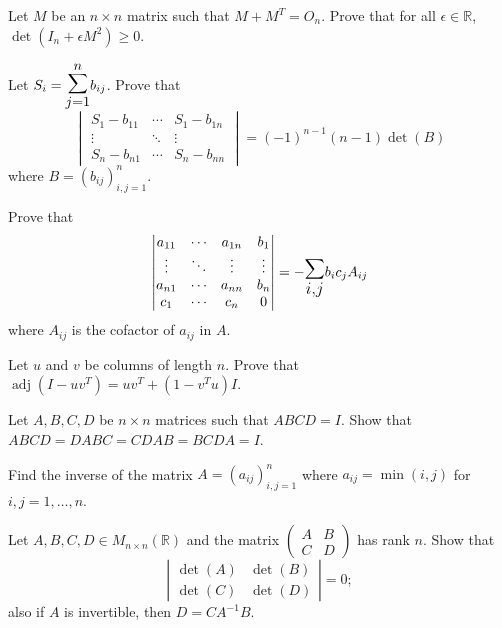 \documentclass[12pt]{article}
\let\oldsum\sum
\renewcommand{\sum}{\mathlarger{\mathlarger{\oldsum}}}
\begin{document}
\begin{problem}
Let $M$ be an $n\times n$ matrix such that $M+M^T=O_n$. Prove that for all $\epsilon\in\mathbb{R}$, $\det(I_n+\epsilon M^2) \ge 0$.
\end{problem}

\begin{problem}
Let $S_i = \sum_{j=1}^n b_{ij}$. Prove that
\[
\begin{vmatrix} S_1-b_{11} & \cdots & S_1-b_{1n}\\ \vdots & \ddots & \vdots\\ S_n-b_{n1} & \cdots & S_n-b_{nn}\end{vmatrix} = (-1)^{n-1}(n-1)\det(B)
\]
where $B=(b_{ij})_{i,j=1}^n$.
\end{problem}

\begin{problem}
Prove that
\[
\begin{vmatrix}
a_{11} & \cdots & a_{1n} & b_1\\
\vdots & \ddots & \vdots & \vdots\\
a_{n1} & \cdots & a_{nn} & b_n\\
c_1 & \cdots & c_n & 0
\end{vmatrix} = -\sum_{i,j} b_ic_jA_{ij}
\]
where $A_{ij}$ is the cofactor of $a_{ij}$ in $A$.
\end{problem}

\begin{problem}
Let $u$ and $v$ be columns of length $n$. Prove that $\operatorname{adj}(I-uv^T) = uv^T + (1-v^Tu)I$.
\end{problem}

\begin{problem}
Let $A,B,C,D$ be $n\times n$ matrices such that $ABCD=I$. Show that $ABCD = DABC = CDAB = BCDA = I$.
\end{problem}

\begin{problem}
Find the inverse of the matrix $A=(a_{ij})_{i,j=1}^n$ where $a_{ij}=\min(i,j)$ for $i,j=1,\dots,n$.
\end{problem}

\begin{problem}
Let $A,B,C,D\in M_{n\times n}(\mathbb{R})$ and the matrix $\begin{pmatrix}A & B\\ C & D\end{pmatrix}$ has rank $n$. Show that
\[
\left|\begin{matrix}\det(A) & \det(B)\\ \det(C) & \det(D)\end{matrix}\right| = 0;
\]
also if $A$ is invertible, then $D=CA^{-1}B$.
\end{problem}
\end{document}
